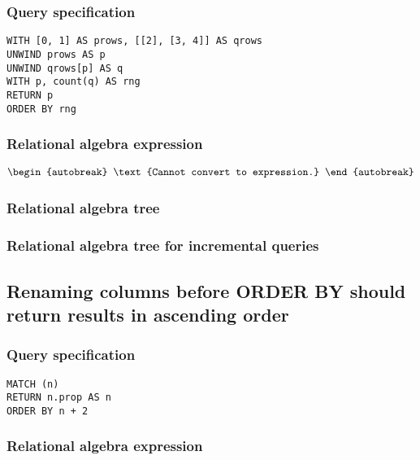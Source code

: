 \subsubsection*{Query specification}

\begin{lstlisting}
WITH [0, 1] AS prows, [[2], [3, 4]] AS qrows
UNWIND prows AS p
UNWIND qrows[p] AS q
WITH p, count(q) AS rng
RETURN p
ORDER BY rng
\end{lstlisting}

\subsubsection*{Relational algebra expression}

\begin{align*}
\begin{autobreak}
\text{Cannot convert to expression.}
\end{autobreak}
\end{align*}

\subsubsection*{Relational algebra tree}


\subsubsection*{Relational algebra tree for incremental queries}


\subsection{Renaming columns before ORDER BY should return results in ascending order}

\subsubsection*{Query specification}

\begin{lstlisting}
MATCH (n)
RETURN n.prop AS n
ORDER BY n + 2
\end{lstlisting}

\subsubsection*{Relational algebra expression}

